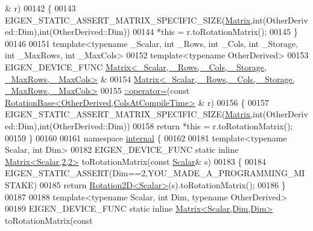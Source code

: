 \begin{DoxyCode}
      & r)
00142 \{
00143   EIGEN\_STATIC\_ASSERT\_MATRIX\_SPECIFIC\_SIZE(\hyperlink{group___core___module_class_eigen_1_1_matrix}{Matrix},\textcolor{keywordtype}{int}(OtherDerived::Dim),\textcolor{keywordtype}{int}(OtherDerived::Dim))
00144   *\textcolor{keyword}{this} = r.toRotationMatrix();
00145 \}
00146 
00151 \textcolor{keyword}{template}<\textcolor{keyword}{typename} \_Scalar, \textcolor{keywordtype}{int} \_Rows, \textcolor{keywordtype}{int} \_Cols, \textcolor{keywordtype}{int} \_Storage, \textcolor{keywordtype}{int} \_MaxRows, \textcolor{keywordtype}{int} \_MaxCols>
00152 \textcolor{keyword}{template}<\textcolor{keyword}{typename} OtherDerived>
00153 EIGEN\_DEVICE\_FUNC \hyperlink{group___core___module_class_eigen_1_1_matrix}{Matrix<\_Scalar, \_Rows, \_Cols, \_Storage, \_MaxRows, \_MaxCols>}
      &
00154 \hyperlink{group___core___module_aa123b56b10819a0cbf5164abb242102f}{Matrix<\_Scalar, \_Rows, \_Cols, \_Storage, \_MaxRows, \_MaxCols>}
00155 \hyperlink{group___core___module_aa123b56b10819a0cbf5164abb242102f}{::operator=}(\textcolor{keyword}{const} \hyperlink{class_eigen_1_1_rotation_base}{RotationBase<OtherDerived,ColsAtCompileTime>}
      & r)
00156 \{
00157   EIGEN\_STATIC\_ASSERT\_MATRIX\_SPECIFIC\_SIZE(\hyperlink{group___core___module_class_eigen_1_1_matrix}{Matrix},\textcolor{keywordtype}{int}(OtherDerived::Dim),\textcolor{keywordtype}{int}(OtherDerived::Dim))
00158   \textcolor{keywordflow}{return} *\textcolor{keyword}{this} = r.toRotationMatrix();
00159 \}
00160 
00161 \textcolor{keyword}{namespace }\hyperlink{namespaceinternal}{internal} \{
00162 
00181 \textcolor{keyword}{template}<\textcolor{keyword}{typename} Scalar, \textcolor{keywordtype}{int} Dim>
00182 EIGEN\_DEVICE\_FUNC \textcolor{keyword}{static} \textcolor{keyword}{inline} \hyperlink{group___core___module_class_eigen_1_1_matrix}{Matrix<Scalar,2,2>} toRotationMatrix(\textcolor{keyword}{const} 
      \hyperlink{class_eigen_1_1_rotation_base_af9b43eac462d7aa70b018efd49c13ef4}{Scalar}& s)
00183 \{
00184   EIGEN\_STATIC\_ASSERT(Dim==2,YOU\_MADE\_A\_PROGRAMMING\_MISTAKE)
00185   \textcolor{keywordflow}{return} \hyperlink{group___geometry___module_class_eigen_1_1_rotation2_d}{Rotation2D<Scalar>}(s).toRotationMatrix();
00186 \}
00187 
00188 \textcolor{keyword}{template}<\textcolor{keyword}{typename} Scalar, \textcolor{keywordtype}{int} Dim, \textcolor{keyword}{typename} OtherDerived>
00189 EIGEN\_DEVICE\_FUNC \textcolor{keyword}{static} \textcolor{keyword}{inline} \hyperlink{group___core___module_class_eigen_1_1_matrix}{Matrix<Scalar,Dim,Dim>} toRotationMatrix(\textcolor{keyword}{const} 

\end{DoxyCode}

